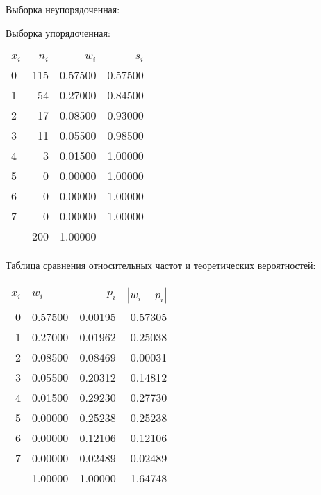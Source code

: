 Выборка неупорядоченная:\newline

\newpage
Выборка упорядоченная:\newline

\newpage


\begin{center}
\begin{tabular}{| l | r | r | r |}
\hline
$x_i$ & $n_i$ & $w_i$ & $s_i$ \\\hline
0 & 115 & 0.57500 & 0.57500 \\\hline
1 & 54 & 0.27000 & 0.84500 \\\hline
2 & 17 & 0.08500 & 0.93000 \\\hline
3 & 11 & 0.05500 & 0.98500 \\\hline
4 & 3 & 0.01500 & 1.00000 \\\hline
5 & 0 & 0.00000 & 1.00000 \\\hline
6 & 0 & 0.00000 & 1.00000 \\\hline
7 & 0 & 0.00000 & 1.00000 \\\hline
  & 200 & 1.00000 &   \\\hline
\end{tabular}
\end{center}

\newline

\newline
Таблица сравнения относительных частот и теоретических вероятностей:\newline
\begin{center}
\begin{tabular}{| r | l | r | r | r |}
\hline
$x_i$ & $w_i$ & $p_i$ & $|w_i-p_i|$ \\\hline
0 & 0.57500 & 0.00195 & 0.57305 \\\hline
1 & 0.27000 & 0.01962 & 0.25038 \\\hline
2 & 0.08500 & 0.08469 & 0.00031 \\\hline
3 & 0.05500 & 0.20312 & 0.14812 \\\hline
4 & 0.01500 & 0.29230 & 0.27730 \\\hline
5 & 0.00000 & 0.25238 & 0.25238 \\\hline
6 & 0.00000 & 0.12106 & 0.12106 \\\hline
7 & 0.00000 & 0.02489 & 0.02489 \\\hline
  & 1.00000 & 1.00000 & 1.64748 \\\hline
\end{tabular}
\end{center}
